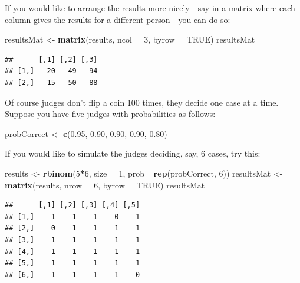 \documentclass[]{book}
\makeatletter
\newenvironment{Shaded}{\begin{snugshade}}{\end{snugshade}}
\newcommand{\KeywordTok}[1]{\textcolor[rgb]{0.13,0.29,0.53}{\textbf{#1}}}
\newcommand{\DataTypeTok}[1]{\textcolor[rgb]{0.13,0.29,0.53}{#1}}
\newcommand{\DecValTok}[1]{\textcolor[rgb]{0.00,0.00,0.81}{#1}}
\newcommand{\FloatTok}[1]{\textcolor[rgb]{0.00,0.00,0.81}{#1}}
\newcommand{\StringTok}[1]{\textcolor[rgb]{0.31,0.60,0.02}{#1}}
\newcommand{\OtherTok}[1]{\textcolor[rgb]{0.56,0.35,0.01}{#1}}
\newcommand{\OperatorTok}[1]{\textcolor[rgb]{0.81,0.36,0.00}{\textbf{#1}}}
\newcommand{\NormalTok}[1]{#1}
\newenvironment{kframe}{%
\medskip{}
\setlength{\fboxsep}{.8em}
 \def\at@end@of@kframe{}%
 \ifinner\ifhmode%
  \def\at@end@of@kframe{\end{minipage}}%
  \begin{minipage}{\columnwidth}%
 \fi\fi%
 \def\FrameCommand##1{\hskip\@totalleftmargin \hskip-\fboxsep
 \colorbox{shadecolor}{##1}\hskip-\fboxsep
     \hskip-\linewidth \hskip-\@totalleftmargin \hskip\columnwidth}%
 \MakeFramed {\advance\hsize-\width
   \@totalleftmargin\z@ \linewidth\hsize
   \@setminipage}}%
 {\par\unskip\endMakeFramed%
 \at@end@of@kframe}
\renewenvironment{Shaded}{\begin{kframe}}{\end{kframe}}
\theoremstyle{definition}
\theoremstyle{definition}
\theoremstyle{definition}
\theoremstyle{remark}
\makeatother
\begin{document}
{\begin{enumerate}
  If you would like to arrange the results more nicely---say in a matrix
  where each column gives the results for a different person---you can
  do so:

\begin{Shaded}
\begin{Highlighting}[]
\NormalTok{resultsMat <-}\StringTok{ }\KeywordTok{matrix}\NormalTok{(results, }\DataTypeTok{ncol =} \DecValTok{3}\NormalTok{, }\DataTypeTok{byrow =} \OtherTok{TRUE}\NormalTok{)}
\NormalTok{resultsMat}
\end{Highlighting}
\end{Shaded}

\begin{verbatim}
##      [,1] [,2] [,3]
## [1,]   20   49   94
## [2,]   15   50   88
\end{verbatim}

  Of course judges don't flip a coin 100 times, they decide one case at
  a time. Suppose you have five judges with probabilities as follows:

\begin{Shaded}
\begin{Highlighting}[]
\NormalTok{probCorrect <-}\StringTok{ }\KeywordTok{c}\NormalTok{(}\FloatTok{0.95}\NormalTok{, }\FloatTok{0.90}\NormalTok{, }\FloatTok{0.90}\NormalTok{, }\FloatTok{0.90}\NormalTok{, }\FloatTok{0.80}\NormalTok{)}
\end{Highlighting}
\end{Shaded}

  If you would like to simulate the judges deciding, say, 6 cases, try
  this:

\begin{Shaded}
\begin{Highlighting}[]
\NormalTok{results <-}\StringTok{ }\KeywordTok{rbinom}\NormalTok{(}\DecValTok{5}\OperatorTok{*}\DecValTok{6}\NormalTok{, }\DataTypeTok{size =} \DecValTok{1}\NormalTok{, }\DataTypeTok{prob=} \KeywordTok{rep}\NormalTok{(probCorrect, }\DecValTok{6}\NormalTok{))}
\NormalTok{resultsMat <-}\StringTok{ }\KeywordTok{matrix}\NormalTok{(results, }\DataTypeTok{nrow =} \DecValTok{6}\NormalTok{, }\DataTypeTok{byrow =} \OtherTok{TRUE}\NormalTok{)}
\NormalTok{resultsMat}
\end{Highlighting}
\end{Shaded}

\begin{verbatim}
##      [,1] [,2] [,3] [,4] [,5]
## [1,]    1    1    1    0    1
## [2,]    0    1    1    1    1
## [3,]    1    1    1    1    1
## [4,]    1    1    1    1    1
## [5,]    1    1    1    1    1
## [6,]    1    1    1    1    0
\end{verbatim}


\end{enumerate}}
\end{document}
